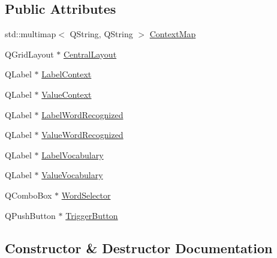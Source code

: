 \subsection*{Public Attributes}
\begin{DoxyCompactItemize}
\item 
std\+::multimap$<$ Q\+String, Q\+String $>$ \hyperlink{classmts_c_m_u_sphinx4_qt_widget_a215fe8155a1355a1c156e2e9e74fdb92}{Context\+Map}
\item 
Q\+Grid\+Layout $\ast$ \hyperlink{classmts_c_m_u_sphinx4_qt_widget_afdd1f19a4fc670f2c558c8f92dc14a6a}{Central\+Layout}
\item 
Q\+Label $\ast$ \hyperlink{classmts_c_m_u_sphinx4_qt_widget_afcbba988a817bb56ff641dcd339c4edd}{Label\+Context}
\item 
Q\+Label $\ast$ \hyperlink{classmts_c_m_u_sphinx4_qt_widget_aafd0a44410ae8607b17990de2e6c51b9}{Value\+Context}
\item 
Q\+Label $\ast$ \hyperlink{classmts_c_m_u_sphinx4_qt_widget_af2821b4951e68f96c43d5d94d7c4bd77}{Label\+Word\+Recognized}
\item 
Q\+Label $\ast$ \hyperlink{classmts_c_m_u_sphinx4_qt_widget_a2fb5f8ac612123f74c38a522309ecf80}{Value\+Word\+Recognized}
\item 
Q\+Label $\ast$ \hyperlink{classmts_c_m_u_sphinx4_qt_widget_ac33991a517fe078cc31fda51fb9593f2}{Label\+Vocabulary}
\item 
Q\+Label $\ast$ \hyperlink{classmts_c_m_u_sphinx4_qt_widget_adc1e85d87dc16c7c8cfa4a005465a401}{Value\+Vocabulary}
\item 
Q\+Combo\+Box $\ast$ \hyperlink{classmts_c_m_u_sphinx4_qt_widget_a3d6acb7e4e230bd1b0b3ca90aba15522}{Word\+Selector}
\item 
Q\+Push\+Button $\ast$ \hyperlink{classmts_c_m_u_sphinx4_qt_widget_ae499f93f33d510e31e91a03901091103}{Trigger\+Button}
\end{DoxyCompactItemize}


\subsection{Constructor \& Destructor Documentation}
\hypertarget{classmts_c_m_u_sphinx4_qt_widget_a2c1f05163a739c9d1e2a952878bb83bd}{}
